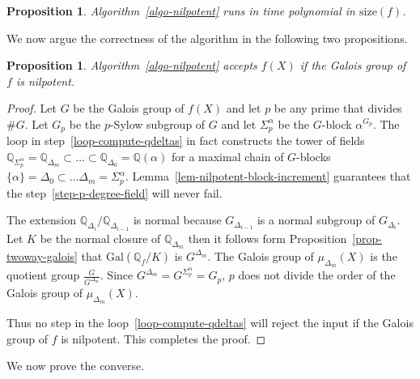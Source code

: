 \documentclass[11pt]{madras}%
\newtheorem{proposition}[theorem]{Proposition}
\theoremstyle{remark}
\newcommand{\Gal}[1]{{\ensuremath{\mathrm{Gal}\left(#1\right)}}}
\newcommand{\size}[1]{{\ensuremath{\mathrm{size}\left(#1\right)}}}
\begin{document}
\begin{proposition}\label{prop-nilpotent-polytime}
  Algorithm~\ref{algo-nilpotent} runs in time polynomial in
  $\size{f}$.
\end{proposition}


We now argue the correctness of the algorithm in the following two
propositions.

\begin{proposition}\label{prop-if-nilpotent-accept}
  Algorithm~\ref{algo-nilpotent} accepts $f(X)$ if the Galois group of
  $f$ is nilpotent.
\end{proposition}
\begin{proof}
  Let $G$ be the Galois group of $f(X)$ and let $p$ be any prime that
  divides $\# G$. Let $G_p$ be the $p$-Sylow subgroup of $G$ and let
  $\Sigma_p^\alpha$ be the $G$-block $\alpha^{G_p}$. The loop in
  step~\ref{loop-compute-qdeltas} in fact constructs the tower of
  fields $\mathbb{Q}_{\Sigma_p^\alpha} = \mathbb{Q}_{\Delta_m} \subset
  \ldots \subset \mathbb{Q}_{\Delta_0} = \mathbb{Q}(\alpha)$ for a
  maximal chain of $G$-blocks $\{ \alpha \} = \Delta_0 \subset \ldots
  \Delta_m = \Sigma_p^\alpha$. 
  Lemma~\ref{lem-nilpotent-block-increment} guarantees that the
  step~\ref{step-p-degree-field} will never fail.

  The extension $\mathbb{Q}_{\Delta_i}/\mathbb{Q}_{\Delta_{i-1}}$ is
  normal because $G_{\Delta_{i-1}}$ is a normal subgroup of
  $G_{\Delta_i}$. Let $K$ be the normal closure of
  $\mathbb{Q}_{\Delta_m}$ then it follows form
  Proposition~\ref{prop-twoway-galois} that $\Gal{\mathbb{Q}_f/K}$ is
  $G^{\Delta_m}$.  The Galois group of $\mu_{\Delta_m}(X)$ is the
  quotient group $\frac{G}{G^{\Delta_m}}$.  Since $G^{\Delta_m} =
  G^{\Sigma_p^\alpha} = G_p$, $p$ does not divide the order of the
  Galois group of $\mu_{\Delta_m}(X)$.

  Thus no step in the loop~\ref{loop-compute-qdeltas} will reject the
  input if the Galois group of $f$ is nilpotent. This completes the
  proof.
\end{proof}

We now prove the converse.
\end{document}
